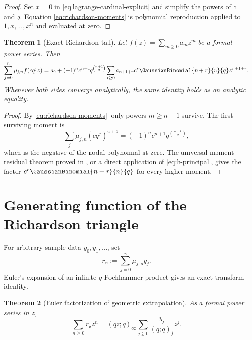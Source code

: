 \documentclass[11pt,oneside]{book}
\numberwithin{equation}{chapter}
\newtheorem{theorem}{Theorem}[chapter]
\theoremstyle{definition}
\theoremstyle{remark}
\begin{document}
\begin{proof}
Set $x=0$ in \eqref{eq:lagrange-cardinal-explicit} and simplify the powers of
$c$ and $q$.  Equation \eqref{eq:richardson-moments} is polynomial
reproduction applied to $1,x,\ldots,x^n$ and evaluated at zero.
\end{proof}

\begin{theorem}[Exact Richardson tail]
\label{thm:richardson-tail}
Let $f(z)=\sum_{m\ge0}a_mz^m$ be a formal power series.  Then
\begin{equation}
 \sum_{j=0}^n\mu_{j,n}f(cq^jz)
 =a_0+(-1)^nc^{n+1}q^{\binom{n+1}{2}}
 \sum_{r\ge0}a_{n+1+r}c^r\GaussianBinomial{n+r}{n}{q}z^{n+1+r}.
 \label{eq:richardson-tail}
\end{equation}
Whenever both sides converge analytically, the same identity holds as an
analytic equality.
\end{theorem}

\begin{proof}
By \eqref{eq:richardson-moments}, only powers $m\ge n+1$ survive.  The first
surviving moment is
\[
 \sum_j\mu_{j,n}(cq^j)^{n+1}
 =(-1)^nc^{n+1}q^{\binom{n+1}{2}},
\]
which is the negative of the nodal polynomial at zero.  The universal moment
residual theorem proved in , or a direct
application of \eqref{eq:h-principal}, gives the factor
$c^r\GaussianBinomial{n+r}{n}{q}$ for every higher moment.
\end{proof}

\section{Generating function of the Richardson triangle}

For arbitrary sample data $y_0,y_1,\ldots$, set
\begin{equation}
 r_n:=\sum_{j=0}^n\mu_{j,n}y_j.
 \label{eq:richardson-output}
\end{equation}
Euler's expansion of an infinite $q$-Pochhammer product gives an exact
transform identity.

\begin{theorem}[Euler factorization of geometric extrapolation]
\label{thm:richardson-generating}
As a formal power series in $z$,
\begin{equation}
 \boxed{
 \sum_{n\ge0}r_nz^n
 =(qz;q)_\infty
  \sum_{j\ge0}\frac{y_j}{(q;q)_j}z^j.}
 \label{eq:richardson-generating}
\end{equation}
\end{theorem}
\end{document}
